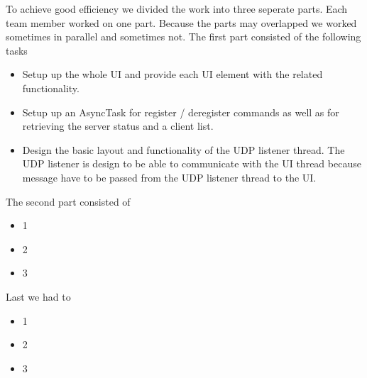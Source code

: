 \documentclass{report}
\begin{document}
To achieve good efficiency we divided the work into three seperate parts. Each team member worked on one part. Because the parts may overlapped we worked sometimes in parallel and sometimes not. The first part consisted of the following tasks
\begin{itemize}
  \item Setup up the whole UI and provide each UI element with the related functionality. 
  \item Setup up an AsyncTask for register / deregister commands as well as for retrieving the server status and a client list.
  \item Design the basic layout and functionality of the UDP listener thread. The UDP listener is design to be able to communicate with the UI thread because message have to be passed from the UDP listener thread to the UI.
\end{itemize}

The second part consisted of
\begin{itemize}
  \item 1
  \item 2
  \item 3
\end{itemize}

Last we had to
\begin{itemize}
  \item 1
  \item 2
  \item 3
\end{itemize}


\end{document}
